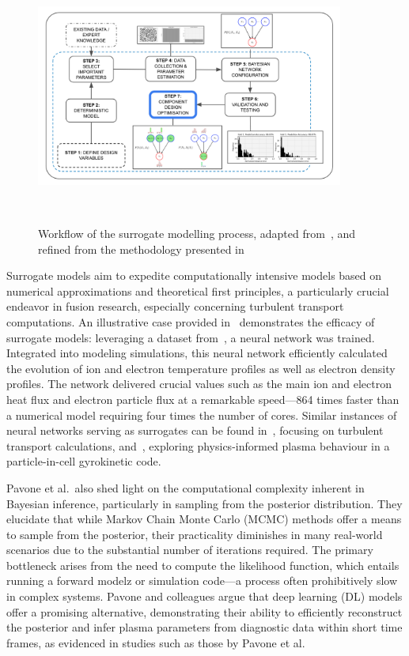 \documentclass[journal]{IEEEtran}
\begin{document}
\begin{figure}[t]
    \centering
    \includegraphics[width=0.9\textwidth]{figures/methodology/workflows/workflow_v5.png}
    \caption{Workflow of the surrogate modelling process, adapted from~\cite{Conti2019}, and refined from the methodology presented in~\cite{Griffiths2024}}~\label{fig:workflow}
\end{figure}


Surrogate models aim to expedite computationally intensive models based on numerical approximations and theoretical first principles, a particularly crucial endeavor in fusion research, especially concerning turbulent transport computations. An illustrative case provided in~\cite{Van2020} demonstrates the efficacy of surrogate models: leveraging a dataset from~\cite{Citrin2017}, a neural network was trained. Integrated into modeling simulations, this neural network efficiently calculated the evolution of ion and electron temperature profiles as well as electron density profiles. The network delivered crucial values such as the main ion and electron heat flux and electron particle flux at a remarkable speed—864 times faster than a numerical model requiring four times the number of cores. Similar instances of neural networks serving as surrogates can be found in~\cite{Meneghini2017}, focusing on turbulent transport calculations, and~\cite{Miller2021}, exploring physics-informed plasma behaviour in a particle-in-cell gyrokinetic code.

Pavone et al.\ also shed light on the computational complexity inherent in Bayesian inference, particularly in sampling from the posterior distribution. They elucidate that while Markov Chain Monte Carlo (MCMC) methods offer a means to sample from the posterior, their practicality diminishes in many real-world scenarios due to the substantial number of iterations required. The primary bottleneck arises from the need to compute the likelihood function, which entails running a forward modelz or simulation code—a process often prohibitively slow in complex systems. Pavone and colleagues argue that deep learning (DL) models offer a promising alternative, demonstrating their ability to efficiently reconstruct the posterior and infer plasma parameters from diagnostic data within short time frames, as evidenced in studies such as those by Pavone et al.~\cite{Pavone2018,Pavone2019, Pavone2020, Pavone2021}
\end{document}
